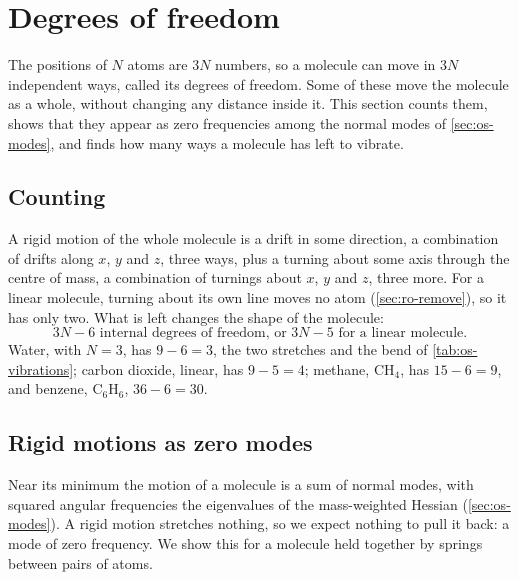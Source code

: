 \section{Degrees of freedom}
\label{sec:ro-freedom}

The positions of $N$ atoms are $3N$ numbers, so a molecule can move in
$3N$ independent ways, called its degrees of freedom. Some of these move
the molecule as a whole, without changing any distance inside it. This
section counts them, shows that they appear as zero frequencies among the
normal modes of \cref{sec:os-modes}, and finds how many ways a molecule
has left to vibrate.

\subsection*{Counting}

A rigid motion of the whole molecule is a drift in some direction, a
combination of drifts along $x$, $y$ and $z$, three ways, plus a turning
about some axis through the centre of mass, a combination of turnings
about $x$, $y$ and $z$, three more. For a linear molecule, turning about
its own line moves no atom (\cref{sec:ro-remove}), so it has only two.
What is left changes the shape of the molecule:
\begin{equation*}
   3N - 6 \text{ internal degrees of freedom, or } 3N - 5
   \text{ for a linear molecule.}
\end{equation*}
Water, with $N = 3$, has $9 - 6 = 3$, the two stretches and the bend of
\cref{tab:os-vibrations}; carbon dioxide, linear, has $9 - 5 = 4$;
methane, CH$_4$, has $15 - 6 = 9$, and benzene, C$_6$H$_6$, $36 - 6 =
30$.

\subsection*{Rigid motions as zero modes}

Near its minimum the motion of a molecule is a sum of normal modes, with
squared angular frequencies the eigenvalues of the mass-weighted Hessian
(\cref{sec:os-modes}). A rigid motion stretches nothing, so we expect
nothing to pull it back: a mode of zero frequency. We show this for a
molecule held together by springs between pairs of atoms.

